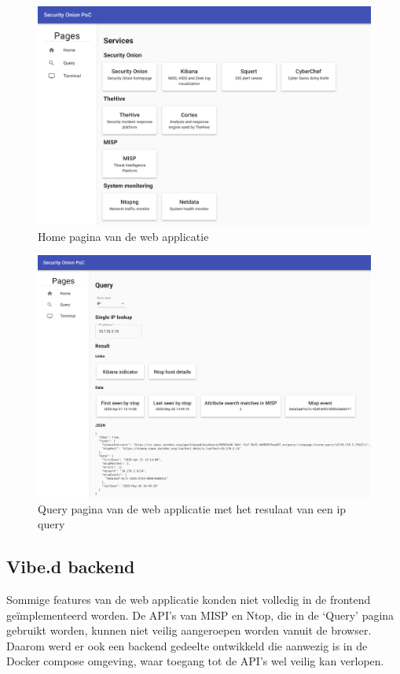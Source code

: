 \documentclass[a4paper,12pt]{report}
\begin{document}
\begin{figure}[H]
  \centering
  \includegraphics[width=\textwidth]{so-manager-home}
  \caption{Home pagina van de web applicatie}
  \label{fig:so-manager-home}
\end{figure}

\begin{figure}[H]
  \centering
  \includegraphics[width=\textwidth]{so-manager-query}
  \caption{Query pagina van de web applicatie met het resulaat van een ip query}
  \label{fig:so-manager-query}
\end{figure}

\subsection{Vibe.d backend}
Sommige features van de web applicatie konden niet volledig in de frontend geïmplementeerd worden.
De API's van MISP en Ntop, die in de `Query' pagina gebruikt worden, kunnen niet veilig aangeroepen worden vanuit de browser.
Daarom werd er ook een backend gedeelte ontwikkeld die aanwezig is in de Docker compose omgeving, waar toegang tot de API's wel veilig kan verlopen.
\end{document}

